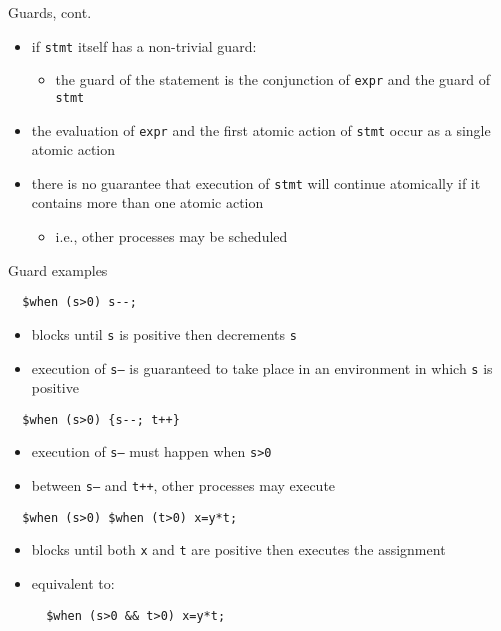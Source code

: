 \documentclass[t]{beamer}
\begin{document}
\begin{frame}{Guards, cont.}
  \begin{itemize}
  \item if \texttt{stmt} itself has a non-trivial guard:
    \begin{itemize}
    \item the guard of the \cwhen{} statement is the conjunction of
      \texttt{expr} and the guard of \texttt{stmt}
    \end{itemize}
  \item the evaluation of \texttt{expr} and the first atomic action of
    \texttt{stmt} occur as a single atomic action
  \item  there is no guarantee that execution of \texttt{stmt}
    will continue atomically if it contains more than one atomic
    action
    \begin{itemize}
    \item i.e., other processes may be scheduled
    \end{itemize}
  \end{itemize}
\end{frame}

\begin{frame}[containsverbatim]{Guard examples}
\begin{verbatim}
  $when (s>0) s--;
\end{verbatim}
  \begin{itemize}
  \item blocks until \texttt{s} is positive then decrements \texttt{s}
  \item execution of \texttt{s--} is guaranteed to take place
    in an environment in which \texttt{s} is positive
  \end{itemize}

\begin{verbatim}
  $when (s>0) {s--; t++}
\end{verbatim}
  \begin{itemize}
  \item execution of \texttt{s--} must happen when \texttt{s>0}
  \item between \texttt{s--} and \texttt{t++}, other processes may
    execute
  \end{itemize}

\begin{verbatim}
  $when (s>0) $when (t>0) x=y*t;
\end{verbatim}
  \begin{itemize}
  \item blocks until both \texttt{x} and \texttt{t} are positive then
    executes the assignment
  \item equivalent to:
\begin{verbatim}
  $when (s>0 && t>0) x=y*t;
\end{verbatim}
  \end{itemize}
\end{frame}
\end{document}
